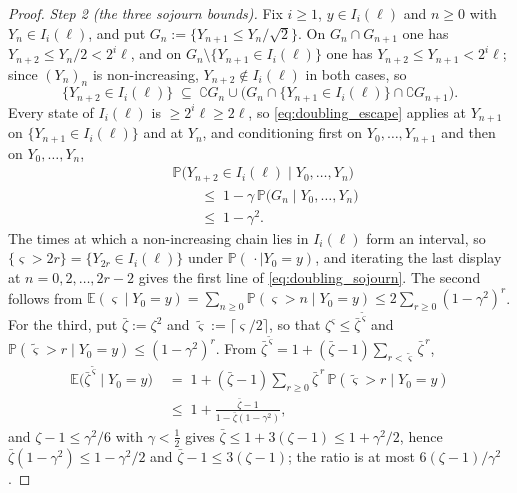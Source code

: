 \begin{proof}
\emph{Step 2 (the three sojourn bounds).} Fix $i\geq1$, $y\in I_i(\ell)$ and $n\geq0$ with
$Y_n\in I_i(\ell)$, and put $G_n:=\{Y_{n+1}\leq Y_n/\sqrt2\}$. On $G_n\cap G_{n+1}$ one has
$Y_{n+2}\leq Y_n/2<2^i\ell$, and on $G_n\setminus\{Y_{n+1}\in I_i(\ell)\}$ one has
$Y_{n+2}\leq Y_{n+1}<2^i\ell$; since $(Y_n)_n$ is non-increasing, $Y_{n+2}\notin I_i(\ell)$ in both
cases, so
\begin{equation}
    \{Y_{n+2}\in I_i(\ell)\}\;\subseteq\;\complement G_n\cup\bigl(G_n\cap\{Y_{n+1}\in I_i(\ell)\}\cap\complement G_{n+1}\bigr).
\end{equation}
Every state of $I_i(\ell)$ is $\geq2^i\ell\geq2\ell$, so \eqref{eq:doubling_escape} applies at
$Y_{n+1}$ on $\{Y_{n+1}\in I_i(\ell)\}$ and at $Y_n$, and conditioning first on $Y_0,\dots,Y_{n+1}$
and then on $Y_0,\dots,Y_n$,
\begin{equation}
\begin{aligned}
    &\mathbb P\bigl(Y_{n+2}\in I_i(\ell)\mid Y_0,\dots,Y_n\bigr)\\
    &\qquad\leq\;1-\gamma\,\mathbb P\bigl(G_n\mid Y_0,\dots,Y_n\bigr)\\
    &\qquad\leq\;1-\gamma^2 .
\end{aligned}
\end{equation}
The times at which a non-increasing chain lies in $I_i(\ell)$ form an interval, so
$\{\varsigma>2r\}=\{Y_{2r}\in I_i(\ell)\}$ under $\mathbb P(\,\cdot\mid Y_0=y)$, and iterating the last display at
$n=0,2,\dots,2r-2$ gives the first line of \eqref{eq:doubling_sojourn}. The second follows from
$\mathbb E(\varsigma\mid Y_0=y)=\sum_{n\geq0}\mathbb P(\varsigma>n\mid Y_0=y)\leq2\sum_{r\geq0}(1-\gamma^2)^{r}$.
For the third, put $\bar\zeta:=\zeta^2$ and $\widetilde\varsigma:=\lceil\varsigma/2\rceil$, so
that $\zeta^{\varsigma}\leq\bar\zeta^{\,\widetilde\varsigma}$ and
$\mathbb P(\widetilde\varsigma>r\mid Y_0=y)\leq(1-\gamma^2)^{r}$. From
$\bar\zeta^{\,\widetilde\varsigma}=1+(\bar\zeta-1)\sum_{r<\widetilde\varsigma}\bar\zeta^{\,r}$,
\begin{equation}
\begin{aligned}
    \mathbb E\bigl(\bar\zeta^{\,\widetilde\varsigma}\mid Y_0=y\bigr)
    \;&=\;1+(\bar\zeta-1)\sum_{r\geq0}\bar\zeta^{\,r}\,\mathbb P(\widetilde\varsigma>r\mid Y_0=y)\\
    \;&\leq\;1+\frac{\bar\zeta-1}{1-\bar\zeta(1-\gamma^2)} ,
\end{aligned}
\end{equation}
and $\zeta-1\leq\gamma^2/6$ with $\gamma<\tfrac12$ gives
$\bar\zeta\leq1+3(\zeta-1)\leq1+\gamma^2/2$, hence $\bar\zeta(1-\gamma^2)\leq1-\gamma^2/2$ and
$\bar\zeta-1\leq3(\zeta-1)$; the ratio is at most $6(\zeta-1)/\gamma^2$.
\end{proof}

